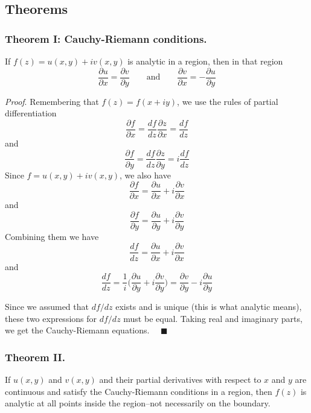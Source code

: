 \documentclass[../main.tex]{subfiles}
\begin{document}
\subsection*{Theorems}
\subsubsection*{Theorem I: Cauchy-Riemann conditions.} If $f(z) = u(x, y) + iv(x, y)$ is analytic in a 
region, then in that region
\begin{equation*}
    \frac{\partial u}{\partial x}=\frac{\partial v}{\partial y}
    \qquad\text{and}\qquad 
    \frac{\partial v}{\partial x}=-\frac{\partial u}{\partial y}
\end{equation*}

\emph{Proof}. Remembering that $f (z)= f (x + iy)$, we use the rules of partial differentiation 
\begin{equation*}
    \frac{\partial f}{\partial x}=\frac{df}{dz}\frac{\partial z}{\partial x}=\frac{df}{dz}
\end{equation*}
and
\begin{equation*}
    \frac{\partial f}{\partial y}=\frac{df}{dz}\frac{\partial z}{\partial y}=i\frac{df}{dz}
\end{equation*}
Since $f = u(x, y) + iv(x, y)$, we also have
\begin{equation*}
    \frac{\partial f}{\partial x}=\frac{\partial u}{\partial x}+i \frac{\partial v}{\partial x}
\end{equation*}
and
\begin{equation*}
    \frac{\partial f}{\partial y}=\frac{\partial u}{\partial y}+i \frac{\partial v}{\partial y}
\end{equation*}
Combining them we have
\begin{equation*}
    \frac{df}{dz}=\frac{\partial u}{\partial x}+i \frac{\partial v}{\partial x}
\end{equation*}
and
\begin{equation*}
    \frac{df}{dz}=\frac{1}{i}\biggl(\frac{\partial u}{\partial y}+i \frac{\partial v}{\partial y}\biggr) =\frac{\partial v}{\partial y}-i \frac{\partial u}{\partial y}
\end{equation*}

Since we assumed that $df /dz$ exists and is unique (this is what analytic means), these two expressions for $df /dz$ must be equal. Taking real and imaginary parts, we get the Cauchy-Riemann equations. $\quad \blacksquare$

\subsubsection*{Theorem II.} If $u(x, y)$ and $v(x, y)$ and their partial derivatives with respect to $x$ and $y$ are continuous and satisfy the Cauchy-Riemann conditions in a region, then $f(z)$ is analytic at all points inside the region--not necessarily on the boundary.
\end{document}
